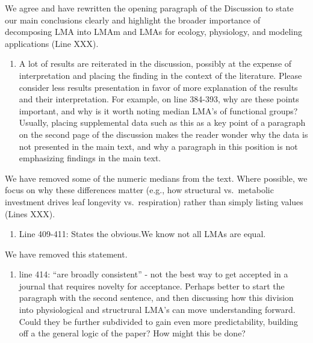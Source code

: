 \documentclass[
  12pt,
  letterpaper,
  DIV=11,
  numbers=noendperiod]{scrartcl}
\providecommand{\tightlist}{%
  \setlength{\itemsep}{0pt}\setlength{\parskip}{0pt}}\usepackage{longtable,booktabs,array}
\renewenvironment{quote}
  {\begin{customblockquote}\color{blockquote-text}\ignorespaces}
  {\end{customblockquote}}
\begin{document}
We agree and have rewritten the opening paragraph of the Discussion to
state our main conclusions clearly and highlight the broader importance
of decomposing LMA into LMAm and LMAs for ecology, physiology, and
modeling applications (Line XXX).

\begin{quote}
\begin{enumerate}
\def\labelenumi{\arabic{enumi})}
\setcounter{enumi}{1}
\tightlist
\item
  A lot of results are reiterated in the discussion, possibly at the
  expense of interpretation and placing the finding in the context of
  the literature. Please consider less results presentation in favor of
  more explanation of the results and their interpretation. For example,
  on line 384-393, why are these points important, and why is it worth
  noting median LMA's of functional groups? Usually, placing
  supplemental data such as this as a key point of a paragraph on the
  second page of the discussion makes the reader wonder why the data is
  not presented in the main text, and why a paragraph in this position
  is not emphasizing findings in the main text.
\end{enumerate}
\end{quote}

We have removed some of the numeric medians from the text. Where
possible, we focus on why these differences matter (e.g., how structural
vs.~metabolic investment drives leaf longevity vs.~respiration) rather
than simply listing values (Lines XXX).

\begin{quote}
\begin{enumerate}
\def\labelenumi{\arabic{enumi})}
\setcounter{enumi}{2}
\tightlist
\item
  Line 409-411: States the obvious.We know not all LMAs are equal.
\end{enumerate}
\end{quote}

We have removed this statement.

\begin{quote}
\begin{enumerate}
\def\labelenumi{\arabic{enumi})}
\setcounter{enumi}{3}
\tightlist
\item
  line 414: ``are broadly consistent'' - not the best way to get
  accepted in a journal that requires novelty for acceptance. Perhaps
  better to start the paragraph with the second sentence, and then
  discussing how this division into physiological and structrural LMA's
  can move understanding forward. Could they be further subdivided to
  gain even more predictability, building off a the general logic of the
  paper? How might this be done?
\end{enumerate}
\end{quote}
\end{document}
